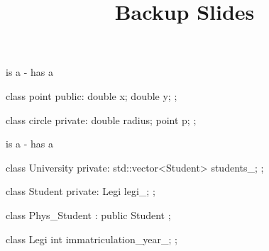 \ifnum\conditionmacro=1 \documentclass[handout,usenames,dvipsnames]{beamer}\fi
\begin{document}
\begin{frame}[fragile]{is a - has a}
\begin{TFCpp}
class point {
public:
	double x;
	double y;
};

class circle {
private:
	double radius;
	point p;
};
\end{TFCpp}
\end{frame}


\begin{frame}[fragile]{is a - has a}
\begin{TFCpp}
class University {
private:
	std::vector<Student> students_;
};

class Student {
private:
	Legi legi_;
};

class Phys_Student : public Student {};

class Legi {
	int immatriculation_year_;
};
\end{TFCpp}
\end{frame}

\title{Backup Slides}

\maketitle
\end{document}
